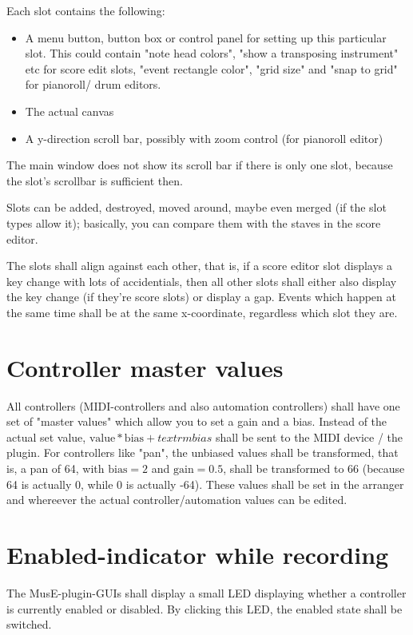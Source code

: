 \documentclass[a4paper]{report}
\begin{document}
Each slot contains the following: 
\begin{itemize}
\item A menu button, button box or control panel for setting up this
      particular slot. This could contain "note head colors", "show
      a transposing instrument" etc for score edit slots, "event
      rectangle color", "grid size" and "snap to grid" for pianoroll/
      drum editors.
\item The actual canvas
\item A y-direction scroll bar, possibly with zoom control (for
      pianoroll editor)
\end{itemize}

The main window does not show its scroll bar if there is only one slot,
because the slot's scrollbar is sufficient then.

Slots can be added, destroyed, moved around, maybe even merged (if the
slot types allow it); basically, you can compare them with the staves
in the score editor.

The slots shall align against each other, that is, if a score editor
slot displays a key change with lots of accidentials, then all other
slots shall either also display the key change (if they're score slots)
or display a gap. Events which happen at the same time shall be at the
same x-coordinate, regardless which slot they are.

\section{Controller master values}
All controllers (MIDI-controllers and also automation controllers)
shall have one set of "master values" which allow you to set a gain and
a bias. Instead of the actual set value, $\textrm{value} * \textrm{bias}
+ textrm{bias}$ shall be sent to the MIDI device / the plugin. For
controllers like "pan", the unbiased values shall be transformed, that
is, a pan of 64, with $\textrm{bias}=2$ and $\textrm{gain}=0.5$, shall
be transformed to 66 (because 64 is actually 0, while 0 is actually -64).
These values shall be set in the arranger and whereever the actual
controller/automation values can be edited.

\section{Enabled-indicator while recording}
The MusE-plugin-GUIs shall display a small LED displaying whether a
controller is currently enabled or disabled. By clicking this LED, the
enabled state shall be switched.
\end{document}

